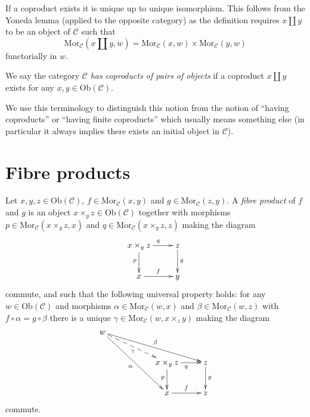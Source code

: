 \noindent
If a coproduct exists it is unique up to unique
isomorphism. This follows from the Yoneda lemma (applied to the
opposite category) as
the definition requires $x \amalg y$ to be an object
of $\mathcal{C}$ such that
$$
\text{Mor}_\mathcal{C}(x \amalg y, w) =
\text{Mor}_\mathcal{C}(x, w) \times \text{Mor}_\mathcal{C}(y, w)
$$
functorially in $w$.

\begin{definition}
\label{definition-has-coproducts-of-pairs}
We say the category $\mathcal{C}$ {\it has coproducts of pairs
of objects} if a coproduct $x \amalg y$
exists for any $x, y \in \text{Ob}(\mathcal{C})$.
\end{definition}

\noindent
We use this terminology to distinguish this notion from the notion
of ``having coproducts'' or ``having finite coproducts'' which usually means
something else (in particular it always implies there exists an
initial object in $\mathcal{C}$).





\section{Fibre products}
\label{section-fibre-products}

\begin{definition}
\label{definition-fibre-products}
Let $x, y, z\in \text{Ob}(\mathcal{C})$,
$f\in \text{Mor}_{\mathcal{C}}(x, y)$
and $g\in \text{Mor}_{\mathcal C}(z, y)$.
A {\it fibre product} of $f$ and $g$ is
an object $x\times_y z\in \text{Ob}(\mathcal{C})$
together with morphisms
$p\in \text{Mor}_{\mathcal C}(x\times_y z, x)$ and
$q\in\text{Mor}_{\mathcal C}(x\times_y z, z)$ making the diagram
$$
\xymatrix{
x\times_y z \ar[r]^{q} \ar[d]_{p}
&
z \ar[d]^{g}
\\
x \ar[r]^{f}
&
y
}
$$
commute, and such that the following universal property holds: for
any $w\in \text{Ob}(\mathcal{C})$ and morphisms
$\alpha \in \text{Mor}_{\mathcal C}(w, x)$ and
$\beta \in \text{Mor}_{\mathcal{C}}(w, z)$ with
$f \circ \alpha= g\circ \beta$
there is a unique
$\gamma\in \text{Mor}_{\mathcal C}(w, x\times_z y)$ making
the diagram
$$
\xymatrix{
w \ar[rrrd]^\beta \ar@{-->}[rrd]_\gamma \ar[rrdd]_\alpha
&
&
\\
&
&
x\times_y z \ar[d]_{p} \ar[r]_{q}
&
z \ar[d]^{g}
\\
&
&
x \ar[r]^{f}
&
z
}
$$
commute.
\end{definition}

